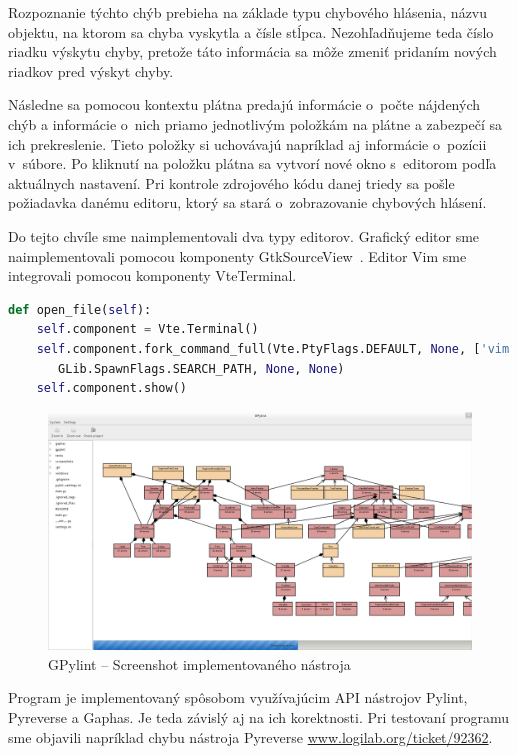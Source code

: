 \documentclass[11pt,oneside,final]{fithesis2}
\begin{document}
	Rozpoznanie týchto chýb prebieha na základe typu chybového hlásenia, názvu objektu, na ktorom sa chyba vyskytla a čísle stĺpca. Nezohľadňujeme teda číslo riadku výskytu chyby, pretože táto informácia sa môže zmeniť pridaním nových riadkov pred výskyt chyby.
	
	Následne sa pomocou kontextu plátna predajú informácie o~počte nájdených chýb a informácie o~nich priamo jednotlivým položkám na plátne a zabezpečí sa ich prekreslenie. Tieto položky si uchovávajú napríklad aj informácie o~pozícii v~súbore. Po kliknutí na položku plátna sa vytvorí nové okno s~editorom podľa aktuálnych nastavení. Pri kontrole zdrojového kódu danej triedy sa pošle požiadavka danému editoru, ktorý sa stará o~zobrazovanie chybových hlásení.

	Do tejto chvíle sme naimplementovali dva typy editorov. Grafický editor sme naimplementovali pomocou komponenty GtkSourceView~\cite{gtksourceview}. Editor Vim sme integrovali pomocou komponenty VteTerminal.
	
	\begin{lstlisting}[language=python]
def open_file(self):                                                      
    self.component = Vte.Terminal()                                     
    self.component.fork_command_full(Vte.PtyFlags.DEFAULT, None, ['vim', self.filepath], [], \
       GLib.SpawnFlags.SEARCH_PATH, None, None)  
    self.component.show()
	\end{lstlisting}
	
	

\begin{figure}[htb]
	 \centering
	 \includegraphics[width=\textwidth]{images/gpylint}
	 \caption{GPylint -- Screenshot implementovaného nástroja}
	\end{figure}
	
		Program je implementovaný spôsobom využívajúcim API nástrojov Pylint, Pyreverse a Gaphas. Je teda závislý aj na ich korektnosti. Pri testovaní programu sme objavili napríklad chybu nástroja Pyreverse \url{www.logilab.org/ticket/92362}.
\end{document}
